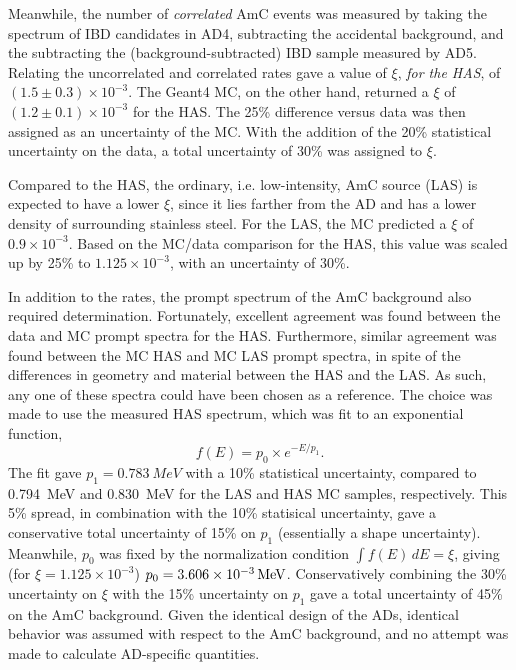 \documentclass[../thesis.tex]{subfiles}
\begin{document}
Meanwhile, the number of \emph{correlated} AmC events was measured by taking the
spectrum of IBD candidates in AD4, subtracting the accidental background, and
the subtracting the (background-subtracted) IBD sample measured by AD5. Relating
the uncorrelated and correlated rates gave a value of $\xi$, \emph{for the HAS},
of $(1.5\pm0.3)\times10^{-3}$. The Geant4 MC, on the other hand, returned a
$\xi$ of $(1.2\pm0.1)\times10^{-3}$ for the HAS. The 25\% difference versus data
was then assigned as an uncertainty of the MC. With the addition of the 20\%
statistical uncertainty on the data, a total uncertainty of 30\% was assigned to
$\xi$.

Compared to the HAS, the ordinary, i.e. low-intensity, AmC source (LAS) is
expected to have a lower $\xi$, since it lies farther from the AD and has a
lower density of surrounding stainless steel. For the LAS, the MC predicted a
$\xi$ of $0.9\times10^{-3}$. Based on the MC/data comparison for the HAS, this
value was scaled up by 25\% to $1.125\times10^{-3}$, with an uncertainty of
30\%.

In addition to the rates, the prompt spectrum of the AmC background also
required determination. Fortunately, excellent agreement was found between the
data and MC prompt spectra for the HAS. Furthermore, similar agreement was found
between the MC HAS and MC LAS prompt spectra, in spite of the differences in
geometry and material between the HAS and the LAS. As such, any one of these
spectra could have been chosen as a reference. The choice was made to use the
measured HAS spectrum, which was fit to an exponential function,
\begin{equation*}
  f(E) = p_0 \times e^{-E/p_1}.
\end{equation*}
The fit gave $p_1 = \SI{0.783}{MeV}$ with a 10\% statistical uncertainty,
compared to \SI{0.794}{MeV} and \SI{0.830}{MeV} for the LAS and HAS MC samples,
respectively. This 5\% spread, in combination with the 10\% statisical
uncertainty, gave a conservative total uncertainty of 15\% on $p_1$ (essentially
a shape uncertainty). Meanwhile, $p_0$ was fixed by the normalization condition
$\int f(E)\,dE = \xi$, giving (for $\xi = 1.125\times10^{-3}$) $p_0 =
\SI[parse-numbers = false]{3.606\times10^{-3}}{/MeV}$. Conservatively combining
the 30\% uncertainty on $\xi$ with the 15\% uncertainty on $p_1$ gave a total
uncertainty of 45\% on the AmC background. Given the identical design of the
ADs, identical behavior was assumed with respect to the AmC background, and no
attempt was made to calculate AD-specific quantities.
\end{document}
